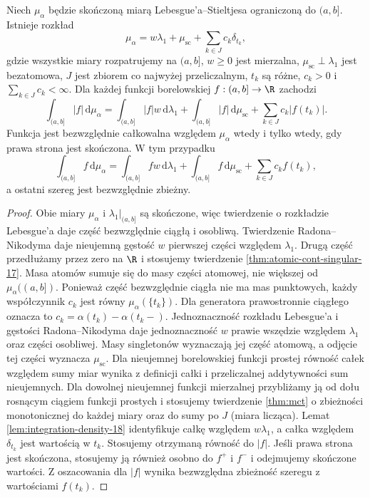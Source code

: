 \begin{twierdzenie}\label{it:thm:stieltjes-decomposition}
Niech $\mu_\alpha$ będzie skończoną miarą Lebesgue'a--Stieltjesa ograniczoną do $(a,b]$. Istnieje rozkład
\[
\mu_\alpha=w\lambda_1+\mu_{\mathrm{sc}}+\sum_{k\in J}c_k\delta_{t_k},
\]
gdzie wszystkie miary rozpatrujemy na $(a,b]$, $w\ge0$ jest mierzalna, $\mu_{\mathrm{sc}}\perp\lambda_1$ jest bezatomowa, $J$ jest zbiorem co najwyżej przeliczalnym, $t_k$ są różne, $c_k>0$ i $\sum_{k\in J}c_k<\infty$. Dla każdej funkcji borelowskiej $f:(a,b]\to\R$ zachodzi
\[
\int_{(a,b]}|f|\,\mathrm d\mu_\alpha
=\int_{(a,b]}|f|w\,\mathrm d\lambda_1+
\int_{(a,b]}|f|\,\mathrm d\mu_{\mathrm{sc}}+
\sum_{k\in J}c_k|f(t_k)|.
\]
Funkcja jest bezwzględnie całkowalna względem $\mu_\alpha$ wtedy i tylko wtedy, gdy prawa strona jest skończona. W tym przypadku
\[
 \int_{(a,b]}f\,\mathrm d\mu_\alpha
 =\int_{(a,b]}fw\,\mathrm d\lambda_1+
 \int_{(a,b]}f\,\mathrm d\mu_{\mathrm{sc}}+
 \sum_{k\in J}c_k f(t_k),
\]
a ostatni szereg jest bezwzględnie zbieżny.
\end{twierdzenie}
\begin{proof}
Obie miary $\mu_\alpha$ i $\lambda_1|_{(a,b]}$ są skończone, więc twierdzenie o rozkładzie Lebesgue'a daje część bezwzględnie ciągłą i osobliwą. Twierdzenie Radona--Nikodyma daje nieujemną gęstość $w$ pierwszej części względem $\lambda_1$. Drugą część przedłużamy przez zero na $\R$ i stosujemy twierdzenie \ref{thm:atomic-cont-singular-17}. Masa atomów sumuje się do masy części atomowej, nie większej od $\mu_\alpha((a,b])$.
Ponieważ część bezwzględnie ciągła nie ma mas punktowych,
każdy współczynnik $c_k$ jest równy
$\mu_\alpha(\{t_k\})$. Dla generatora prawostronnie
ciągłego oznacza to $c_k=\alpha(t_k)-\alpha(t_k-)$.
Jednoznaczność rozkładu Lebesgue'a i gęstości
Radona--Nikodyma daje jednoznaczność $w$ prawie wszędzie
względem $\lambda_1$ oraz części osobliwej.
Masy singletonów wyznaczają jej część atomową,
a odjęcie tej części wyznacza $\mu_{\mathrm{sc}}$.
Dla nieujemnej borelowskiej funkcji prostej równość całek względem sumy miar wynika z definicji całki i przeliczalnej addytywności sum nieujemnych. Dla dowolnej nieujemnej funkcji mierzalnej przybliżamy ją od dołu rosnącym ciągiem funkcji prostych i stosujemy twierdzenie \ref{thm:mct} o zbieżności monotonicznej do każdej miary oraz do sumy po $J$ (miara licząca). Lemat \ref{lem:integration-density-18} identyfikuje całkę względem $w\lambda_1$, a całka względem $\delta_{t_k}$ jest wartością w $t_k$. Stosujemy otrzymaną równość do $|f|$. Jeśli prawa strona jest skończona, stosujemy ją również osobno do $f^+$ i $f^-$ i odejmujemy skończone wartości. Z oszacowania dla $|f|$ wynika bezwzględna zbieżność szeregu z wartościami $f(t_k)$.
\end{proof}

